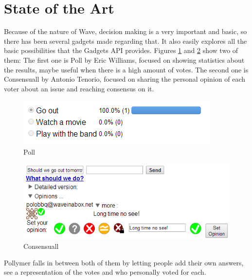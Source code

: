 \section{State of the Art}
\label{subsec:decision_soa}
Because of the nature of Wave, decision making is a very important and basic, so there has been several gadgets made regarding that. It also easily explores all the basic possibilities that the Gadgets API provides. Figures \ref{fig:poll} and \ref{fig:consensuall} show two of them: The first one is Poll by Eric Williams, focused on showing statistics about the results, maybe useful when there is a high amount of votes. The second one is Consensuall \cite{ref:consensuall} by Antonio Tenorio, focused on sharing the personal opinion of each voter about an issue and reaching consensus on it.\\[.2cm]
\begin{figure}[h]
  \center
    \includegraphics[keepaspectratio, scale=0.7]{Media/Captures/Extensions/DecisionGadgets/other.png}
  \caption{Poll}
  \label{fig:poll}
\end{figure}
\begin{figure}[h]
  \center    
    \includegraphics[keepaspectratio, scale=0.7]{Media/Captures/Extensions/DecisionGadgets/consensuall.png}
  \caption{Consensuall}
  \label{fig:consensuall}
\end{figure}
Pollymer falls in between both of them by letting people add their own answers, see a representation of the votes and who personally voted for each.

